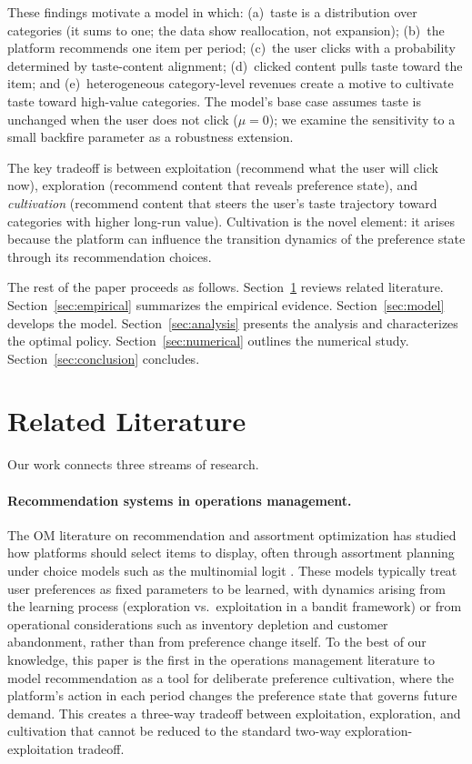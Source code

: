 \documentclass[11pt]{article}
\begin{document}
These findings motivate a model in which: (a)~taste is a distribution over categories (it sums to one; the data show reallocation, not expansion); (b)~the platform recommends one item per period; (c)~the user clicks with a probability determined by taste-content alignment; (d)~clicked content pulls taste toward the item; and (e)~heterogeneous category-level revenues create a motive to cultivate taste toward high-value categories. The model's base case assumes taste is unchanged when the user does not click ($\mu = 0$); we examine the sensitivity to a small backfire parameter as a robustness extension.

The key tradeoff is between exploitation (recommend what the user will click now), exploration (recommend content that reveals preference state), and \emph{cultivation} (recommend content that steers the user's taste trajectory toward categories with higher long-run value). Cultivation is the novel element: it arises because the platform can influence the transition dynamics of the preference state through its recommendation choices.

The rest of the paper proceeds as follows. Section~\ref{sec:lit} reviews related literature. Section~\ref{sec:empirical} summarizes the empirical evidence. Section~\ref{sec:model} develops the model. Section~\ref{sec:analysis} presents the analysis and characterizes the optimal policy. Section~\ref{sec:numerical} outlines the numerical study. Section~\ref{sec:conclusion} concludes.

\section{Related Literature}
\label{sec:lit}

Our work connects three streams of research.

\paragraph{Recommendation systems in operations management.} The OM literature on recommendation and assortment optimization has studied how platforms should select items to display, often through assortment planning under choice models such as the multinomial logit \citep[e.g.,][]{rusmevichientong2010dynamic, saure2013optimal, agrawal2019mnl}. These models typically treat user preferences as fixed parameters to be learned, with dynamics arising from the learning process (exploration vs.\ exploitation in a bandit framework) or from operational considerations such as inventory depletion and customer abandonment, rather than from preference change itself. To the best of our knowledge, this paper is the first in the operations management literature to model recommendation as a tool for deliberate preference cultivation, where the platform's action in each period changes the preference state that governs future demand. This creates a three-way tradeoff between exploitation, exploration, and cultivation that cannot be reduced to the standard two-way exploration-exploitation tradeoff.
\end{document}
